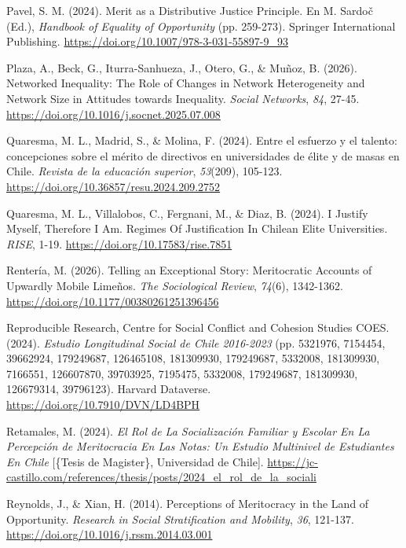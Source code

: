\documentclass[
  spanish,
  a4paper,
  oneside]{scrbook}
\newlength{\cslhangindent}
\newenvironment{CSLReferences}[2] %
 {\begin{list}{}{%
  \setlength{\itemindent}{0pt}
  \setlength{\leftmargin}{0pt}
  \setlength{\parsep}{0pt}
  \ifodd #1
   \setlength{\leftmargin}{\cslhangindent}
   \setlength{\itemindent}{-1\cslhangindent}
  \fi
  \setlength{\itemsep}{#2\baselineskip}}}
 {\end{list}}
\begin{document}
\begin{CSLReferences}{1}{0}
Pavel, S. M. (2024). Merit as a {Distributive Justice Principle}. En M.
Sardoč (Ed.), \emph{Handbook of {Equality} of {Opportunity}} (pp.
259-273). Springer International Publishing.
\url{https://doi.org/10.1007/978-3-031-55897-9_93}

Plaza, A., Beck, G., Iturra-Sanhueza, J., Otero, G., \& Muñoz, B.
(2026). Networked Inequality: {The} Role of Changes in Network
Heterogeneity and Network Size in Attitudes towards Inequality.
\emph{Social Networks}, \emph{84}, 27-45.
\url{https://doi.org/10.1016/j.socnet.2025.07.008}

Quaresma, M. L., Madrid, S., \& Molina, F. (2024). {Entre el esfuerzo y
el talento: concepciones sobre el mérito de directivos en universidades
de élite y de masas en Chile}. \emph{Revista de la educación superior},
\emph{53}(209), 105-123.
\url{https://doi.org/10.36857/resu.2024.209.2752}

Quaresma, M. L., Villalobos, C., Fergnani, M., \& Diaz, B. (2024). I
{Justify Myself}, {Therefore I} Am. {Regimes Of Justification In Chilean
Elite Universities}. \emph{RISE}, 1-19.
\url{https://doi.org/10.17583/rise.7851}

Rentería, M. (2026). Telling an Exceptional Story: {Meritocratic}
Accounts of Upwardly Mobile {Limeños}. \emph{The Sociological Review},
\emph{74}(6), 1342-1362. \url{https://doi.org/10.1177/00380261251396456}

Reproducible Research, Centre for Social Conflict and Cohesion Studies
COES. (2024). \emph{Estudio {Longitudinal Social} de {Chile} 2016-2023}
(pp. 5321976, 7154454, 39662924, 179249687, 126465108, 181309930,
179249687, 5332008, 181309930, 7166551, 126607870, 39703925, 7195475,
5332008, 179249687, 181309930, 126679314, 39796123). Harvard Dataverse.
\url{https://doi.org/10.7910/DVN/LD4BPH}

Retamales, M. (2024). \emph{{El Rol de La Socialización Familiar y
Escolar En La Percepción de Meritocracia En Las Notas: Un Estudio
Multinivel de Estudiantes En Chile}} {[}\{Tesis de Magister\},
Universidad de Chile{]}.
\url{https://jc-castillo.com/references/thesis/posts/2024_el_rol_de_la_sociali}

Reynolds, J., \& Xian, H. (2014). Perceptions of Meritocracy in the Land
of Opportunity. \emph{Research in Social Stratification and Mobility},
\emph{36}, 121-137. \url{https://doi.org/10.1016/j.rssm.2014.03.001}


\end{CSLReferences}
\end{document}
